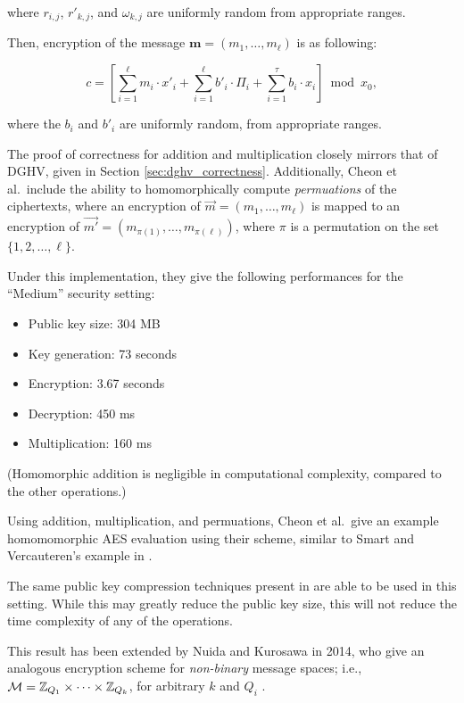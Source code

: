     where $r_{i,j}$, $r'_{k,j}$, and $\omega_{k, j}$ are uniformly random from appropriate ranges.

    Then, encryption of the message $\mathbf{m} = (m_1, \dots, m_\ell)$ is as following:

    \[c = \left[ \sum_{i = 1}^\ell m_i \cdot x'_i + \sum_{i=1}^\ell b'_i \cdot \Pi_i + \sum_{i = 1}^\tau b_i \cdot x_i \right] \bmod x_0,\]

    where the $b_i$ and $b'_i$ are uniformly random, from appropriate ranges.

    The proof of correctness for addition and multiplication closely mirrors that of DGHV, given in Section \ref{sec:dghv_correctness}. Additionally, Cheon et al.~include the ability to homomorphically compute \emph{permuations} of the ciphertexts, where an encryption of $\vec{m} = (m_1, \dots, m_\ell)$ is mapped to an encryption of $\vec{m'} = (m_{\pi(1)}, \dots, m_{\pi(\ell)})$, where $\pi$ is a permutation on the set $\{1, 2, \dots, \ell\}$.

    Under this implementation, they give the following performances for the ``Medium'' security setting:
    \begin{itemize}
        \item Public key size: 304 MB
        \item Key generation: 73 seconds
        \item Encryption: 3.67 seconds
        \item Decryption: 450 ms
        \item Multiplication: 160 ms
    \end{itemize}

    (Homomorphic addition is negligible in computational complexity, compared to the other operations.)

    Using addition, multiplication, and permuations, Cheon et al.~give an example homomomorphic AES evaluation using their scheme, similar to Smart and Vercauteren's example in \cite{SV09-2}.

    The same public key compression techniques present in \cite{Coron2012} are able to be used in this setting. While this may greatly reduce the public key size, this will not reduce the time complexity of any of the operations.

    This result has been extended by Nuida and Kurosawa in 2014, who give an analogous encryption scheme for \emph{non-binary} message spaces; i.e., $\mathcal{M} = \mathbb{Z}_{Q_1} \times \dots \times \mathbb{Z}_{Q_k}$, for arbitrary $k$ and $Q_i$ \cite{Nuida2015}.
